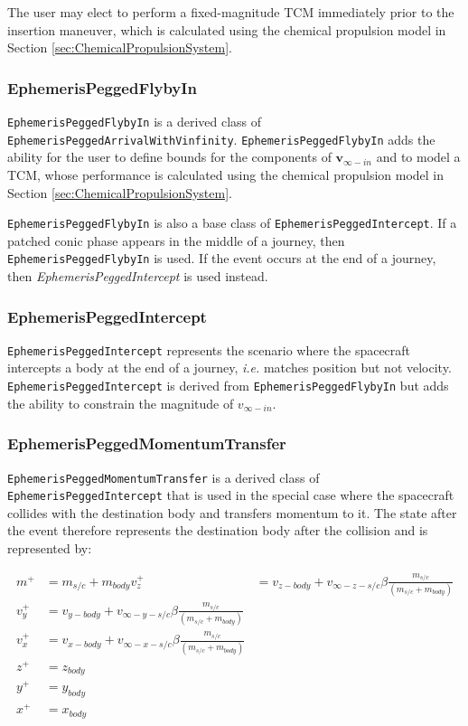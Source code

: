 The user may elect to perform a fixed-magnitude TCM immediately prior to the insertion maneuver, which is calculated using the chemical propulsion model in Section \ref{sec:ChemicalPropulsionSystem}.

\subsubsection{EphemerisPeggedFlybyIn}
\label{subsubsec:EphemerisPeggedFlybyIn}

\texttt{EphemerisPeggedFlybyIn} is a derived class of \texttt{EphemerisPeggedArrivalWithVinfinity}. \texttt{EphemerisPeggedFlybyIn} adds the ability for the user to define bounds for the components of $\mathbf{v}_{\infty-in}$ and to model a TCM, whose performance is calculated using the chemical propulsion model in Section \ref{sec:ChemicalPropulsionSystem}.

\texttt{EphemerisPeggedFlybyIn} is also a base class of \texttt{EphemerisPeggedIntercept}. If a patched conic phase appears in the middle of a journey, then \texttt{EphemerisPeggedFlybyIn} is used. If the event occurs at the end of a journey, then \textit{EphemerisPeggedIntercept} is used instead.

\subsubsection{EphemerisPeggedIntercept}
\label{subsubsec:EphemerisPeggedIntercept}

\texttt{EphemerisPeggedIntercept} represents the scenario where the spacecraft intercepts a body at the end of a journey, \textit{i.e.} matches position but not velocity. \texttt{EphemerisPeggedIntercept} is derived from \texttt{EphemerisPeggedFlybyIn} but adds the ability to constrain the magnitude of  $v_{\infty-in}$.


\subsubsection{EphemerisPeggedMomentumTransfer}
\label{subsubsec:ephemerispeggedmomentumtransfer}

\texttt{EphemerisPeggedMomentumTransfer} is a derived class of \texttt{EphemerisPeggedIntercept} that is used in the special case where the spacecraft collides with the destination body and transfers momentum to it. The state after the event therefore represents the destination body after the collision and is represented by:

\begin{align}
	\label{eq:ephemerispeggedmomentumtransfer}
	m^+ &= m_{s/c} + m_{body}
	v_z^+ &= v_{z-body} + v_{\infty-z-s/c} \beta \frac{m_{s/c}}{\left(m_{s/c} + m_{body}\right)}\\
	v_y^+ &= v_{y-body} + v_{\infty-y-s/c} \beta \frac{m_{s/c}}{\left(m_{s/c} + m_{body}\right)}\\
	v_x^+ &= v_{x-body} + v_{\infty-x-s/c} \beta \frac{m_{s/c}}{\left(m_{s/c} + m_{body}\right)}\\
	z^+ &= z_{body}\\
	y^+ &= y_{body}\\
	x^+ &= x_{body}\\
\end{align}

